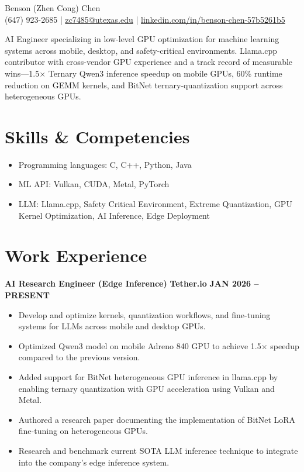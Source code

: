 \documentclass[10pt]{article}
\begin{document}
\begin{center}
{\LARGE Benson (Zhen Cong) Chen}\\
(647) 923-2685 \;|\; \href{mailto:zc7485@utexas.edu}{zc7485@utexas.edu} \;|\; \href{https://linkedin.com/in/benson-chen-57b5261b5}{linkedin.com/in/benson-chen-57b5261b5}
\end{center}

\vspace{0.5em}
AI Engineer specializing in low-level GPU optimization for machine learning systems across mobile, desktop, and safety-critical environments. Llama.cpp contributor with cross-vendor GPU experience and a track record of measurable wins---1.5$\times$ Ternary Qwen3 inference speedup on mobile GPUs, 60\% runtime reduction on GEMM kernels, and BitNet ternary-quantization support across heterogeneous GPUs.

\section*{Skills \& Competencies}
\begin{minipage}[t]{0.48\textwidth}
\begin{itemize}
  \item Programming languages: C, C++, Python, Java
  \item ML API: Vulkan, CUDA, Metal, PyTorch
\end{itemize}
\end{minipage}%
\hfill
\begin{minipage}[t]{0.48\textwidth}
\begin{itemize}
  \item LLM: Llama.cpp, Safety Critical Environment, Extreme Quantization, GPU Kernel Optimization, AI Inference, Edge Deployment
\end{itemize}
\end{minipage}

\section*{Work Experience}
\textbf{AI Research Engineer (Edge Inference)} \hfill \textbf{Tether.io} \hfill \textbf{JAN 2026 -- PRESENT}
\begin{itemize}
  \item Develop and optimize kernels, quantization workflows, and fine-tuning systems for LLMs across mobile and desktop GPUs. 
  \item Optimized Qwen3 model on mobile Adreno 840 GPU to achieve 1.5$\times$ speedup compared to the previous version.
  \item Added support for BitNet heterogeneous GPU inference in llama.cpp by enabling ternary quantization with GPU acceleration using Vulkan and Metal.
  \item Authored a research paper documenting the implementation of BitNet LoRA fine-tuning on heterogeneous GPUs.
  \item Research and benchmark current SOTA LLM inference technique to integrate into the company's edge inference system.
\end{itemize}
\end{document}
